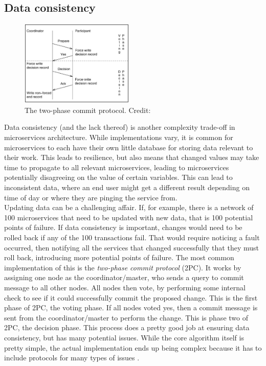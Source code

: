 \subsection{Data consistency}
\begin{figure}
    \centering
    \includegraphics[width=0.48\textwidth]{Figures/two_phase_commit.png}
    \caption{The two-phase commit protocol. Credit: \cite*{Samaras2009}}
    \label{2PC}
\end{figure}

Data consistency (and the lack thereof) is another complexity trade-off in microservices architecture.
While implementations vary, it is common for microservices to each have their own little database for storing data relevant to their work.
This leads to resilience, but also means that changed values may take time to propagate to all relevant microservices, leading to microservices potentially disagreeing on the value of certain variables.
This can lead to inconsistent data, where an end user might get a different result depending on time of day or where they are pinging the service from.\\
Updating data can be a challenging affair. If, for example, there is a network of 100 microservices that need to be updated with new data, that is 100 potential points of failure.
If data consistency is important, changes would need to be rolled back if any of the 100 transactions fail.
That would require noticing a fault occurred, then notifying all the services that changed successfully that they must roll back, introducing more potential points of failure.
The most common implementation of this is the \textit{two-phase commit protocol} (2PC).
It works by assigning one node as the coordinator/master, who sends a query to commit message to all other nodes.
All nodes then vote, by performing some internal check to see if it could successfully commit the proposed change.
This is the first phase of 2PC, the voting phase.
If all nodes voted yes, then a commit message is sent from the coordinator/master to perform the change.
This is phase two of 2PC, the decision phase.
This process does a pretty good job at ensuring data consistency, but has many potential issues.
While the core algorithm itself is pretty simple, the actual implementation ends up being complex because it has to include protocols for many types of issues \cite*{Samaras2009}.


